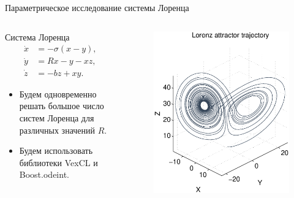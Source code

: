 \documentclass[@BEAMER_OPTIONS@]{beamer}
\begin{document}
\begin{frame}[fragile]{Параметрическое исследование системы Лоренца}
    \begin{columns}
        \begin{column}{0.6\textwidth}
            \begin{block}{Система Лоренца}
                \vspace{-1\baselineskip}
                \begin{align*}
                    \dot{x} &= -\sigma \left( x - y \right), \\
                    \dot{y} &= R x - y - xz, \\
                    \dot{z} &= -bz + xy.
                    \label{eq:lorenz}
                \end{align*}
            \end{block}
            \begin{itemize}
                \item Будем одновременно решать большое число систем Лоренца
                    для различных значений $R$.
                \item Будем использовать библиотеки VexCL и Boost.odeint.
            \end{itemize}
        \end{column}
        \begin{column}{0.4\textwidth}
            \begin{figure}
                \includegraphics[width=\textwidth]{lorenz}
            \end{figure}
        \end{column}
    \end{columns}
\end{frame}
\end{document}
